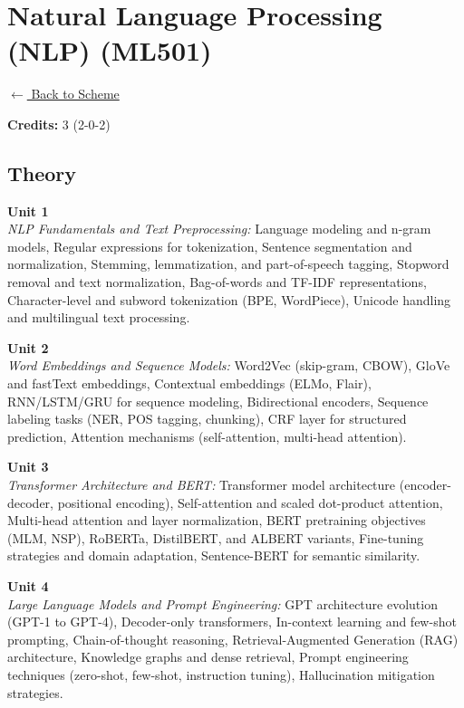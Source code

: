 \section*{Natural Language Processing (NLP) (ML501)}
\label{major:ML_5}

\noindent \small{\hyperref[main:scheme]{$\leftarrow$ Back to Scheme}} \vspace{0.5cm}

\noindent \textbf{Credits:} 3 (2-0-2)

\subsection*{Theory}
\noindent\textbf{Unit 1} \\
\textit{NLP Fundamentals and Text Preprocessing:} Language modeling and n-gram models, Regular expressions for tokenization, Sentence segmentation and normalization, Stemming, lemmatization, and part-of-speech tagging, Stopword removal and text normalization, Bag-of-words and TF-IDF representations, Character-level and subword tokenization (BPE, WordPiece), Unicode handling and multilingual text processing.

\vspace{0.3cm}

\noindent\textbf{Unit 2} \\
\textit{Word Embeddings and Sequence Models:} Word2Vec (skip-gram, CBOW), GloVe and fastText embeddings, Contextual embeddings (ELMo, Flair), RNN/LSTM/GRU for sequence modeling, Bidirectional encoders, Sequence labeling tasks (NER, POS tagging, chunking), CRF layer for structured prediction, Attention mechanisms (self-attention, multi-head attention).

\vspace{0.3cm}

\noindent\textbf{Unit 3} \\
\textit{Transformer Architecture and BERT:} Transformer model architecture (encoder-decoder, positional encoding), Self-attention and scaled dot-product attention, Multi-head attention and layer normalization, BERT pretraining objectives (MLM, NSP), RoBERTa, DistilBERT, and ALBERT variants, Fine-tuning strategies and domain adaptation, Sentence-BERT for semantic similarity.

\vspace{0.3cm}

\noindent\textbf{Unit 4} \\
\textit{Large Language Models and Prompt Engineering:} GPT architecture evolution (GPT-1 to GPT-4), Decoder-only transformers, In-context learning and few-shot prompting, Chain-of-thought reasoning, Retrieval-Augmented Generation (RAG) architecture, Knowledge graphs and dense retrieval, Prompt engineering techniques (zero-shot, few-shot, instruction tuning), Hallucination mitigation strategies.

